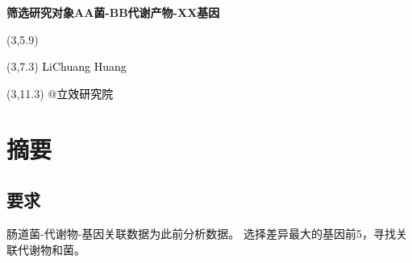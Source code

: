 \documentclass[
]{article}
\author{}
\date{\vspace{-2.5em}}
\begin{document}
\begin{titlepage} 
\begin{center} \textbf{\Huge
筛选研究对象AA菌-BB代谢产物-XX基因} \vspace{4em}
\begin{textblock}{10}(3,5.9) \huge
\textbf{\textcolor{white}{2024-06-24}}
\end{textblock} \begin{textblock}{10}(3,7.3)
\Large \textcolor{black}{LiChuang Huang}
\end{textblock} \begin{textblock}{10}(3,11.3)
\Large \textcolor{black}{@立效研究院}
\end{textblock} \end{center} \end{titlepage}
\restoregeometry


\begin{center}\vspace{1.5cm}\end{center}\tableofcontents

\begin{center}\vspace{1.5cm}\end{center}\listoffigures

\begin{center}\vspace{1.5cm}\end{center}\listoftables

\newpage


\hypertarget{abstract}{%
\section{摘要}\label{abstract}}

\hypertarget{ux8981ux6c42}{%
\subsection{要求}\label{ux8981ux6c42}}

肠道菌-代谢物-基因关联数据为此前分析数据。
选择差异最大的基因前5，寻找关联代谢物和菌。
\end{document}
